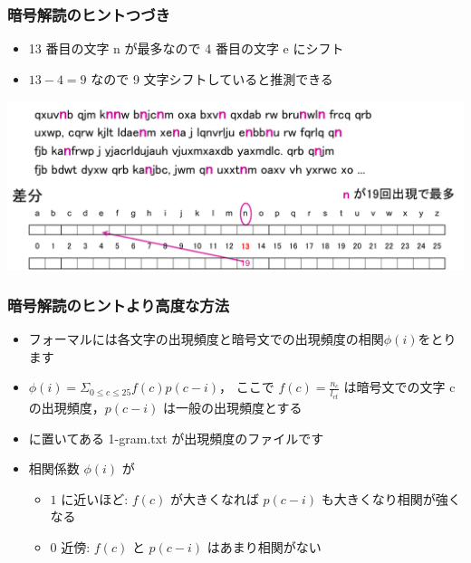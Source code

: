 \begin{frame}
\frametitle{暗号解読のヒント\textemdash つづき}
  \begin{itemize}
\item 13 番目の文字 n が最多なので 4 番目の文字 e にシフト
\item \(13-4=9\) なので 9 文字シフトしていると推測できる
  \end{itemize}
  \begin{center}
\includegraphics[scale=0.3]{./Figure/elementaryCS-figHindo.pdf}
  \end{center}
\end{frame}
\begin{frame}
\frametitle{暗号解読のヒント\textemdash より高度な方法}
  \begin{itemize}
\item フォーマルには各文字の出現頻度と暗号文での出現頻度の相関\(\phi(i)\)をとります
\item \(\phi(i)=\Sigma_{0\leq c\leq 25}f(c)p(c-i)\)， ここで \(f(c)=\frac{n_c}{l_{ct}}\) は暗号文での文字 c の出現頻度，\(p(c-i)\) は一般の出現頻度とする
\item \href{https://sites.google.com/presystems.xyz/elementarycs/top}{}に置いてある 1-gram.txt が出現頻度のファイルです
\item 相関係数 \(\phi(i)\) が
    \begin{itemize}
\item $1$ に近いほど: \(f(c)\) が大きくなれば \(p(c-i)\) も大きくなり相関が強くなる
\item $0$ 近傍: \(f(c)\) と \(p(c-i)\) はあまり相関がない
    \end{itemize}
  \end{itemize}
\end{frame}
